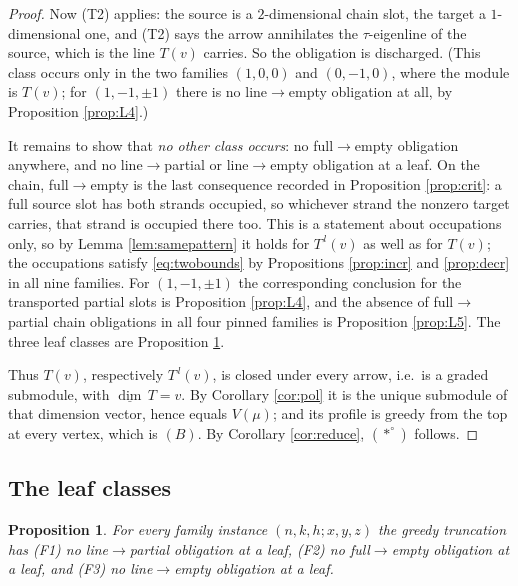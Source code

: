 \documentclass[reqno]{amsart}
\theoremstyle{plain}
\newtheorem{proposition}[theorem]{Proposition}
\theoremstyle{definition}
\newcommand{\dimv}{\underline{\dim}\,}
\begin{document}
\begin{proof}
Now (T2) applies: the source is a $2$-dimensional chain slot, the target a
$1$-dimensional one, and (T2) says the arrow annihilates the $\tau$-eigenline
of the source, which is the line $T(v)$ carries.  So the obligation is
discharged.  (This class occurs only in the two families $(1,0,0)$ and
$(0,-1,0)$, where the module is $T(v)$; for $(1,-1,\pm1)$ there is no
line$\to$empty obligation at all, by Proposition \ref{prop:L4}.)

\smallskip
It remains to show that \emph{no other class occurs}: no full$\to$empty
obligation anywhere, and no line$\to$partial or line$\to$empty obligation at a
leaf.  On the chain, full$\to$empty is the last consequence recorded in
Proposition \ref{prop:crit}: a full source slot has both strands occupied, so
whichever strand the nonzero target carries, that strand is occupied there
too.  This is a statement about occupations only, so by Lemma
\ref{lem:samepattern} it holds for $T^{\,l}(v)$ as well as for $T(v)$; the
occupations satisfy \eqref{eq:twobounds} by Propositions \ref{prop:incr} and
\ref{prop:decr} in all nine families.  For $(1,-1,\pm1)$ the corresponding
conclusion for the transported partial slots is Proposition \ref{prop:L4}, and
the absence of full$\to$partial chain obligations in all four pinned families
is Proposition \ref{prop:L5}.  The three leaf classes are Proposition
\ref{prop:leafclasses}.

Thus $T(v)$, respectively $T^{\,l}(v)$, is closed under every arrow, i.e.\ is a
graded submodule, with $\dimv T=v$.  By Corollary \ref{cor:pol} it is the unique
submodule of that dimension vector, hence equals $V(\mu)$; and its profile is
greedy from the top at every vertex, which is $(B)$.  By
Corollary \ref{cor:reduce}, $(*^\circ)$ follows.
\end{proof}

\subsection{The leaf classes}

\begin{proposition}\label{prop:leafclasses}
For every family instance $(n,k,h;x,y,z)$ the greedy truncation has
\textup{(F1)} no line$\to$partial obligation at a leaf, \textup{(F2)} no
full$\to$empty obligation at a leaf, and \textup{(F3)} no line$\to$empty
obligation at a leaf.
\end{proposition}
\end{document}
